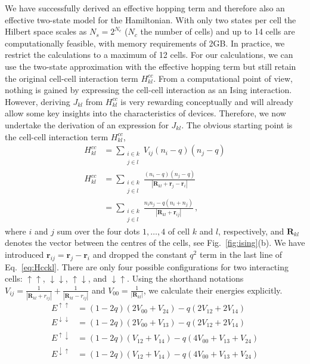 We have successfully derived an effective hopping term and therefore also an
effective two-state model for the  Hamiltonian. With only two states
per cell the Hilbert space scales as $N_s = 2^{N_c}$ ($N_c$ the number of cells)
and up to 14 cells are computationally feasible, with memory requirements of
2GB. In practice, we restrict the calculations to a maximum of 12 cells. For our
calculations, we can use the two-state approximation with the effective hopping
term but still retain the original cell-cell interaction term $H^{cc}_{kl}$.
From a computational point of view, nothing is gained by expressing the
cell-cell interaction as an Ising interaction. However, deriving $J_{kl}$ from
$H^{cc}_{kl}$ is very rewarding conceptually and will already allow some key
insights into the characteristics of  devices. Therefore, we now
undertake the derivation of an expression for $J_{kl}$. The obvious starting
point is the cell-cell interaction term $H^{cc}_{kl}$, 
%
\begin{equation}
\begin{split}
\label{eq:Hcckl}
  H^{cc}_{kl} 
  &=
  \sum_{\substack{i \in k\\j \in l}} V_{ij} \left( n_i - q \right) \left( n_j - q \right) \\
  H^{cc}_{kl}
  &= 
  \sum_{\substack{i \in k\\j \in l}}
  \frac{ \left( n_i - q \right) \left( n_j - q \right) }
       { \left| \bm{R}_{kl} + \bm{r}_j - \bm{r}_i \right| } \\
  &=
  \sum_{\substack{i \in k\\j \in l}}
  \frac{n_i n_j - q (n_i + n_j)}
       {\left| \bm{R}_{kl} + \bm{r}_{ij} \right|} \, ,
\end{split}
\end{equation}
%
where $i$ and $j$ sum over the four dots $1, \ldots, 4$ of cell $k$ and $l$,
respectively, and $\bm{R}_{kl}$ denotes the vector between the centres of the
cells, see Fig.~\ref{fig:ising}(b). We have introduced $\bm{r}_{ij} = \bm{r}_j -
\bm{r}_i$ and dropped the constant $q^2$ term in the last line of
Eq.~\eqref{eq:Hcckl}. There are only four possible configurations for two
interacting cells: $\uparrow\uparrow$, $\downarrow\downarrow$,
$\uparrow\downarrow$, and $\downarrow\uparrow$. Using the shorthand notations
$V_{ij} = \frac{1}{\left| \bm{R}_{kl} + r_{ij} \right|} + \frac{1}{\left|
\bm{R}_{kl} - r_{ij} \right|}$ and $V_{00} = \frac{1}{\left| \bm{R}_{kl}
\right|}$, we calculate their energies explicitly.
\begin{align}
  E^{\uparrow\uparrow}
  &=
  \left( 1 - 2 q \right) \left( 2 V_{00} + V_{24} \right)
  - q \left( 2 V_{12} + 2 V_{14} \right)
  \\
  E^{\downarrow\downarrow}
  &=
  \left( 1 - 2 q \right) \left( 2 V_{00} + V_{13} \right)
  - q \left( 2 V_{12} + 2 V_{14} \right)
  \\
  E^{\uparrow\downarrow}
  &=
  \left( 1 - 2 q \right) \left( V_{12} + V_{14} \right)
  - q \left( 4 V_{00} + V_{13} + V_{24} \right)
  \\
  E^{\downarrow\uparrow}
  &=
  \left( 1 - 2 q \right) \left( V_{12} + V_{14} \right)
  - q \left( 4 V_{00} + V_{13} + V_{24} \right)
\end{align}
